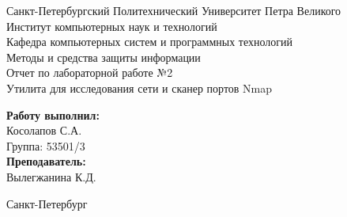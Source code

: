 \documentclass[a4paper]{article}
\begin{document}

\begin{titlepage}	%

	\begin{center}		%

		\large Санкт-Петербургский Политехнический Университет Петра Великого\\
		\large Институт компьютерных наук и технологий \\
		\large Кафедра компьютерных систем и программных технологий\\[6cm]
		
		\huge Методы и средства защиты информации\\[0.5cm] %
		\large Отчет по лабораторной работе №2\\[0.1cm]
		\large Утилита для исследования сети и сканер портов Nmap\\[5cm]

	\end{center}


	\begin{flushright} %
		\begin{minipage}{0.25\textwidth} %
			\begin{flushleft} %

				\large\textbf{Работу выполнил:}\\
				\large Косолапов С.А.\\
				\large {Группа:} 53501/3\\
				
				\large \textbf{Преподаватель:}\\
				\large Вылегжанина К.Д.

			\end{flushleft}
		\end{minipage}
	\end{flushright}
	
	\vfill %

	\begin{center}
	\large Санкт-Петербург\\
	\large \the\year %
	\end{center} %

\thispagestyle{empty} %
\end{titlepage} %
\end{document}
